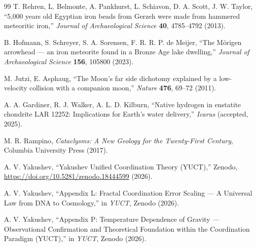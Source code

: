 \documentclass[11pt,a4paper]{article}
\begin{document}
\begin{thebibliography}{99}
		T. Rehren, L. Belmonte, A. Pankhurst, L. Schiavon, D. A. Scott, J. W. Taylor, ``5,000 years old Egyptian iron beads from Gerzeh were made from hammered meteoritic iron,''
		\emph{Journal of Archaeological Science} \textbf{40}, 4785–4792 (2013).
		
		B. Hofmann, S. Schreyer, S. A. Sorensen, F. R. R. P. de Meijer, ``The Mörigen arrowhead — an iron meteorite found in a Bronze Age lake dwelling,''
		\emph{Journal of Archaeological Science} \textbf{156}, 105800 (2023).
		
		M. Jutzi, E. Asphaug, ``The Moon's far side dichotomy explained by a low-velocity collision with a companion moon,''
		\emph{Nature} \textbf{476}, 69–72 (2011).
		
		A. A. Gardiner, R. J. Walker, A. L. D. Kilburn, ``Native hydrogen in enstatite chondrite LAR 12252: Implications for Earth's water delivery,''
		\emph{Icarus} (accepted, 2025).
		
		M. R. Rampino, \emph{Cataclysms: A New Geology for the Twenty-First Century},
		Columbia University Press (2017).
		
		A. V. Yakushev, ``Yakushev Unified Coordination Theory (YUCT),''
		Zenodo, \url{https://doi.org/10.5281/zenodo.18444599} (2026).
		
		A. V. Yakushev, ``Appendix L: Fractal Coordination Error Scaling — A Universal Law from DNA to Cosmology,''
		in \emph{YUCT}, Zenodo (2026).
		
		A. V. Yakushev, ``Appendix P: Temperature Dependence of Gravity — Observational Confirmation and Theoretical Foundation within the Coordination Paradigm (YUCT),''
		in \emph{YUCT}, Zenodo (2026).
		

\end{thebibliography}
\end{document}
